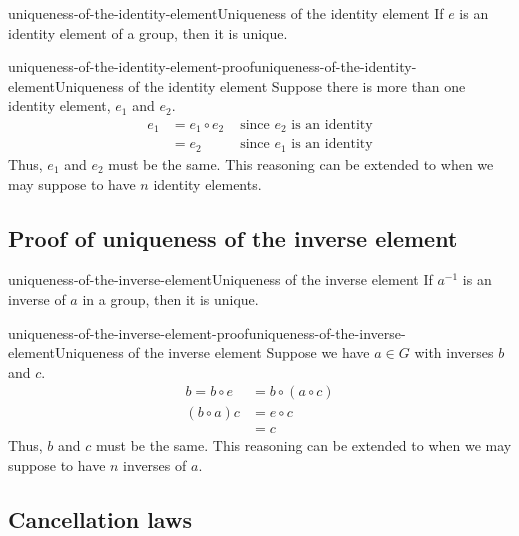 \documentclass[preview]{standalone}
\begin{document}
\begin{snippettheorem}{uniqueness-of-the-identity-element}{Uniqueness of the identity element}
    If \(e\) is an identity element of a group, then it is unique.
\end{snippettheorem}

\begin{snippetproof}{uniqueness-of-the-identity-element-proof}{uniqueness-of-the-identity-element}{Uniqueness of the identity element}
    Suppose there is more than one identity element, \(e_1\) and \(e_2\).
    \begin{align*}
        e_1 &= e_1 \circ e_2 &\text { since \(e_2\) is an identity} \\
        &= e_2 &\text { since \(e_1\) is an identity}
    \end{align*}
    Thus, \(e_1\) and \(e_2\) must be the same. This reasoning can be extended
    to when we may suppose to have \(n\) identity elements.
\end{snippetproof}

\subsection{Proof of uniqueness of the inverse element}

\begin{snippettheorem}{uniqueness-of-the-inverse-element}{Uniqueness of the inverse element}
    If \(a^{-1}\) is an inverse of \(a\) in a group, then it is unique.
\end{snippettheorem}

\begin{snippetproof}{uniqueness-of-the-inverse-element-proof}{uniqueness-of-the-inverse-element}{Uniqueness of the inverse element}
    Suppose we have \(a\in G\) with inverses \(b\) and \(c\).
    \begin{align*}
        b = b \circ e &= b \circ (a \circ c)\\
        (b \circ a) c &= e \circ c \\
        &= c
    \end{align*}
    Thus, \(b\) and \(c\) must be the same. This reasoning can be extended
    to when we may suppose to have \(n\) inverses of \(a\).
\end{snippetproof}

\subsection{Cancellation laws}
\end{document}
